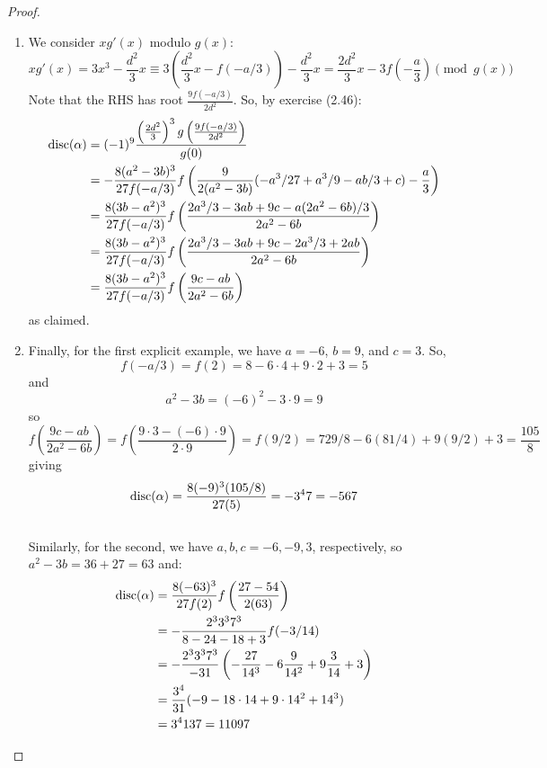 \begin{proof}
\begin{enumerate}
\item
    We consider $xg'(x)$ modulo $g(x)$:
    \[ xg'(x) = 3x^3 - \frac{d^2}{3}x \equiv 3\left(\frac{d^2}{3}x-f(-a/3)\right)-\frac{d^2}{3}x = \frac{2d^2}{3}x-3f\left(-\frac{a}{3}\right) \pmod{g(x)} \]
    Note that the RHS has root $\frac{9f(-a/3)}{2d^2}$. So, by exercise (2.46):
    \begin{align*}
    \operatorname{disc}(\alpha)
        &= (-1)^9\frac{\left(\frac{2d^2}{3}\right)^3g\left(\frac{9f(-a/3)}{2d^2}\right)}{g(0)} \\
        &= -\frac{8(a^2-3b)^3}{27f(-a/3)}f\left(\frac{9}{2(a^2-3b)}(-a^3/27+a^3/9-ab/3+c)-\frac{a}{3}\right) \\
        &= \frac{8(3b-a^2)^3}{27f(-a/3)}f\left(\frac{2a^3/3-3ab+9c-a(2a^2-6b)/3}{2a^2-6b}\right) \\
        &= \frac{8(3b-a^2)^3}{27f(-a/3)}f\left(\frac{2a^3/3-3ab+9c-2a^3/3+2ab}{2a^2-6b}\right) \\
        &= \frac{8(3b-a^2)^3}{27f(-a/3)}f\left(\frac{9c-ab}{2a^2-6b}\right)
    \end{align*}
    as claimed.

\item
    Finally, for the first explicit example, we have $a=-6$, $b=9$, and $c=3$. So,
    \[ f(-a/3) = f(2) = 8 - 6 \cdot 4 + 9 \cdot 2 + 3 = 5 \]
    and
    \[ a^2-3b = (-6)^2-3 \cdot 9 = 9 \]
    so
    \[ f\left(\frac{9c-ab}{2a^2-6b}\right) = f\left(\frac{9 \cdot 3 - (-6) \cdot 9}{2 \cdot 9}\right) = f(9/2) = 729/8 - 6(81/4) + 9(9/2)+3 = \frac{105}{8}  \]
    giving
    \[ \operatorname{disc}(\alpha) = \frac{8(-9)^3(105/8)}{27(5)} = -3^47 = -567 \] \\

    Similarly, for the second, we have $a,b,c = -6,-9,3$, respectively, so $a^2-3b = 36+27 = 63$ and:
    \begin{align*}
    \operatorname{disc}(\alpha)
        &= \frac{8(-63)^3}{27f(2)}f\left(\frac{27-54}{2(63)}\right) \\
        &= -\frac{2^33^37^3}{8-24-18+3}f(-3/14) \\
        &= -\frac{2^33^37^3}{-31}\left(-\frac{27}{14^3}-6\frac{9}{14^2}+9\frac{3}{14}+3\right) \\
        &= \frac{3^4}{31}(-9 - 18 \cdot 14 + 9 \cdot 14^2 + 14^3) \\
        &= 3^4137 = 11097
    \end{align*}\qedhere
\end{enumerate}
\end{proof}
